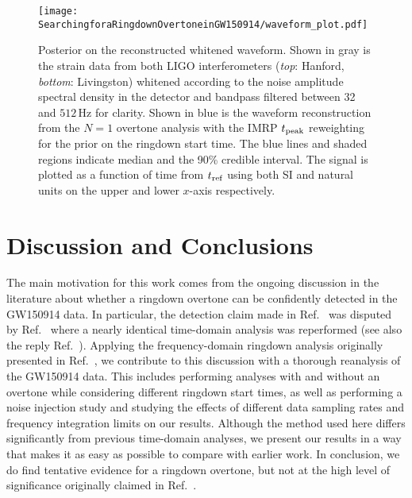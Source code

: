 \begin{figure*}[t]
	\centering
	\texttt{[image: SearchingforaRingdownOvertoneinGW150914/waveform\_plot.pdf]}
	\caption[Posterior on the GW150914 reconstructed whitened waveform]{ 
		Posterior on the reconstructed whitened waveform.
		Shown in gray is the strain data from both LIGO interferometers (\emph{top}: Hanford, \emph{bottom}: Livingston) whitened according to the noise amplitude spectral density in the detector and bandpass filtered between 32 and $512\,\mathrm{Hz}$ for clarity.
		Shown in blue is the waveform reconstruction from the $N=1$ overtone analysis with the IMRP $t_{\rm peak}$ reweighting for the prior on the ringdown start time.
		The blue lines and shaded regions indicate median and the 90\% credible interval. 
		The signal is plotted as a function of time from $t_{\rm ref}$ using both SI and natural units on the upper and lower $x$-axis respectively.
	}
	\label{fig:waveform}
\end{figure*}


\section{Discussion and Conclusions}\label{ch4:sec:discussion}

The main motivation for this work comes from the ongoing discussion in the literature about whether a ringdown overtone can be confidently detected in the GW150914 data. 
In particular, the detection claim made in Ref.~\cite{Isi:2019aib} was disputed by Ref.~\cite{Cotesta:2022pci} where a nearly identical time-domain analysis was reperformed (see also the reply Ref.~\cite{Isi:2022mhy}).
Applying the frequency-domain ringdown analysis originally presented in Ref.~\cite{Finch:2021qph}, we contribute to this discussion with a thorough reanalysis of the GW150914 data. 
This includes performing analyses with and without an overtone while considering different ringdown start times, as well as performing a noise injection study and studying the effects of different data sampling rates and frequency integration limits on our results.
Although the method used here differs significantly from previous time-domain analyses, we present our results in a way that makes it as easy as possible to compare with earlier work.
In conclusion, we do find tentative evidence for a ringdown overtone, but not at the high level of significance originally claimed in Ref.~\cite{Isi:2019aib}.

